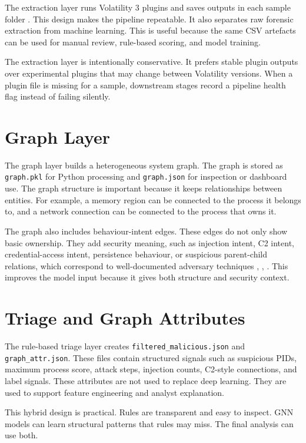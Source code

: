 The extraction layer runs Volatility 3 plugins and saves outputs in each sample folder \cite{volatility3docs}. This design makes the pipeline repeatable. It also separates raw forensic extraction from machine learning. This is useful because the same CSV artefacts can be used for manual review, rule-based scoring, and model training.

The extraction layer is intentionally conservative. It prefers stable plugin outputs over experimental plugins that may change between Volatility versions. When a plugin file is missing for a sample, downstream stages record a pipeline health flag instead of failing silently.

\section{Graph Layer}

The graph layer builds a heterogeneous system graph. The graph is stored as \texttt{graph.pkl} for Python processing and \texttt{graph.json} for inspection or dashboard use. The graph structure is important because it keeps relationships between entities. For example, a memory region can be connected to the process it belongs to, and a network connection can be connected to the process that owns it.

The graph also includes behaviour-intent edges. These edges do not only show basic ownership. They add security meaning, such as injection intent, C2 intent, credential-access intent, persistence behaviour, or suspicious parent-child relations, which correspond to well-documented adversary techniques \cite{mitre2026enterprise}, \cite{mitre2026t1055}, \cite{mitre2026t1486}. This improves the model input because it gives both structure and security context.

\section{Triage and Graph Attributes}

The rule-based triage layer creates \texttt{filtered\_malicious.json} and \texttt{graph\_attr.json}. These files contain structured signals such as suspicious PIDs, maximum process score, attack steps, injection counts, C2-style connections, and label signals. These attributes are not used to replace deep learning. They are used to support feature engineering and analyst explanation.

This hybrid design is practical. Rules are transparent and easy to inspect. GNN models can learn structural patterns that rules may miss. The final analysis can use both.


